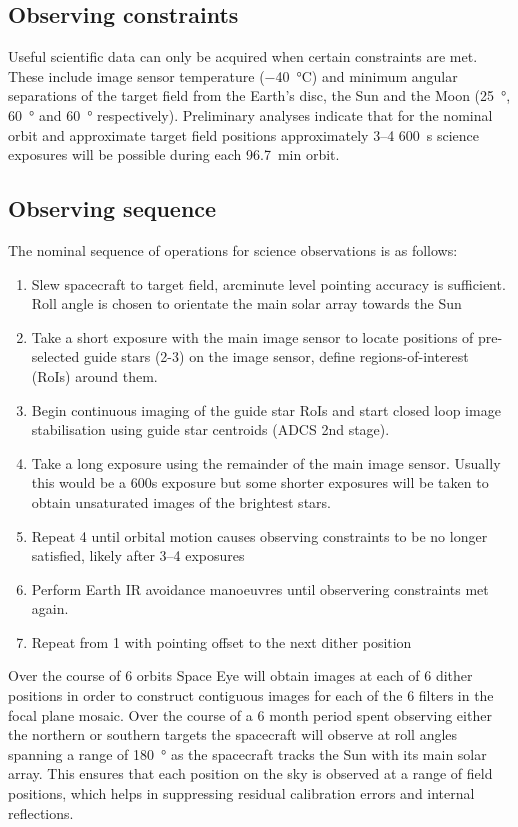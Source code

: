 \documentclass[]{iac}
\begin{document}
\subsection{Observing constraints}
\label{sec:obsconst}

Useful scientific data can only be acquired when certain constraints are met. These include image sensor temperature
(\SI{-40}{\celsius}) and minimum angular separations of the target field from the Earth's disc, the Sun and the Moon
(\SI{25}{\degree}, \SI{60}{\degree} and \SI{60}{\degree} respectively). Preliminary analyses indicate that for the
nominal orbit and approximate target field positions approximately 3--4 \SI{600}{\second} science exposures will be
possible during each \SI{96.7}{\minute} orbit.

\subsection{Observing sequence}

The nominal sequence of operations for science observations is as follows:

\begin{enumerate}
  \item{Slew spacecraft to target field, arcminute level pointing accuracy is sufficient. Roll angle is chosen to
    orientate the main solar array towards the Sun}
  \item{Take a short exposure with the main image sensor to locate positions of pre-selected guide stars (2-3) on the
    image sensor, define regions-of-interest (RoIs) around them.}
  \item{Begin continuous imaging of the guide star RoIs and start closed loop image stabilisation using guide star
    centroids (ADCS 2nd stage).}
  \item{Take a long exposure using the remainder of the main image sensor. Usually this would be a 600s exposure but
    some shorter exposures will be taken to obtain unsaturated images of the brightest stars.}
  \item{Repeat 4 until orbital motion causes observing constraints to be no longer satisfied, likely after 3--4
    exposures}
  \item{Perform Earth IR avoidance manoeuvres until observering constraints met again.}
  \item{Repeat from 1 with pointing offset to the next dither position}
\end{enumerate}

Over the course of 6 orbits Space Eye will obtain images at each of 6 dither positions in order to construct contiguous
images for each of the 6 filters in the focal plane mosaic. Over the course of a 6 month period spent observing either
the northern or southern targets the spacecraft will observe at roll angles spanning a range of \SI{180}{\degree} as the
spacecraft tracks the Sun with its main solar array. This ensures that each position on the sky is observed at a range
of field positions, which helps in suppressing residual calibration errors and internal reflections.
\end{document}

